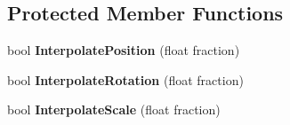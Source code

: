 \subsection*{Protected Member Functions}
\begin{DoxyCompactItemize}
\item 
\mbox{\label{classTarbora_1_1SceneNode_a26548c16efbc646bf05be26b5847298a}} 
bool {\bfseries Interpolate\+Position} (float fraction)
\item 
\mbox{\label{classTarbora_1_1SceneNode_ac2266aace714e0a05116a9d46036b8d1}} 
bool {\bfseries Interpolate\+Rotation} (float fraction)
\item 
\mbox{\label{classTarbora_1_1SceneNode_a618ad014ed8c56f14a20cc0b49337859}} 
bool {\bfseries Interpolate\+Scale} (float fraction)
\end{DoxyCompactItemize}
